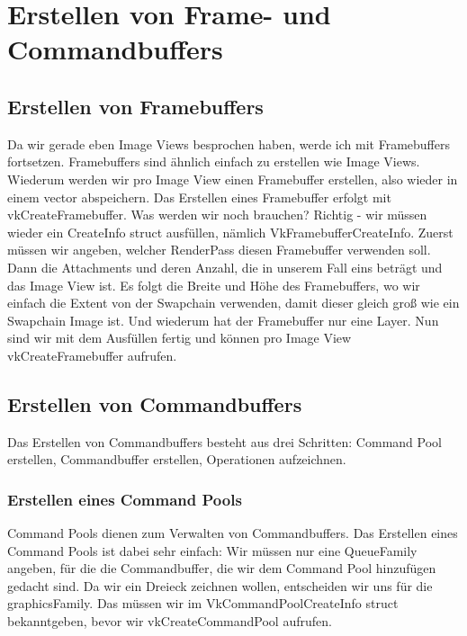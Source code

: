 \documentclass[11pt,a4paper]{report}
\begin{document}
\section{Erstellen von Frame- und Commandbuffers}
\subsection{Erstellen von Framebuffers}
Da wir gerade eben Image Views besprochen haben, werde ich mit Framebuffers fortsetzen. Framebuffers sind ähnlich einfach zu erstellen wie Image Views. Wiederum werden wir pro Image View einen Framebuffer erstellen, also wieder in einem vector abspeichern. Das Erstellen eines Framebuffer erfolgt mit vkCreateFramebuffer. Was werden wir noch brauchen? Richtig - wir müssen wieder ein CreateInfo struct ausfüllen, nämlich VkFramebufferCreateInfo. Zuerst müssen wir angeben, welcher RenderPass diesen Framebuffer verwenden soll. Dann die Attachments und deren Anzahl, die in unserem Fall eins beträgt und das Image View ist. Es folgt die Breite und Höhe des Framebuffers, wo wir einfach die Extent von der Swapchain verwenden, damit dieser gleich groß wie ein Swapchain Image ist. Und wiederum hat der Framebuffer nur eine Layer. Nun sind wir mit dem Ausfüllen fertig und können pro Image View vkCreateFramebuffer aufrufen.

\subsection{Erstellen von Commandbuffers}
Das Erstellen von Commandbuffers besteht aus drei Schritten: Command Pool erstellen, Commandbuffer erstellen, Operationen aufzeichnen.

\subsubsection{Erstellen eines Command Pools}
Command Pools dienen zum Verwalten von Commandbuffers. Das Erstellen eines Command Pools ist dabei sehr einfach: Wir müssen nur eine QueueFamily angeben, für die die Commandbuffer, die wir dem Command Pool hinzufügen gedacht sind. Da wir ein Dreieck zeichnen wollen, entscheiden wir uns für die graphicsFamily. Das müssen wir im VkCommandPoolCreateInfo struct bekanntgeben, bevor wir vkCreateCommandPool aufrufen.
\end{document}
